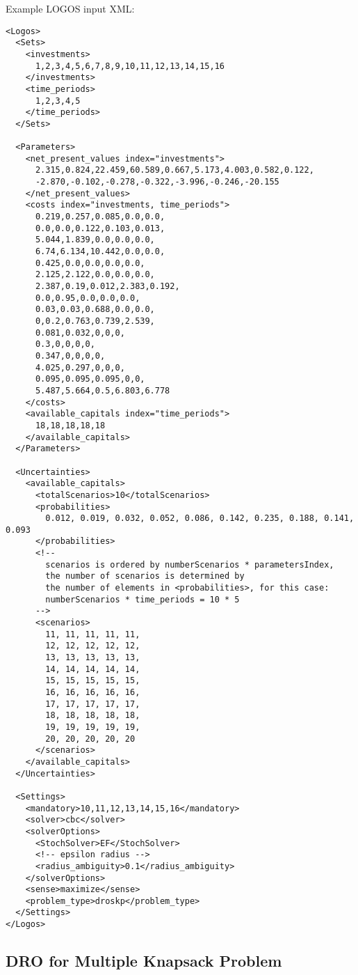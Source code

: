 Example LOGOS input XML:
\begin{lstlisting}[style=XML]
<Logos>
  <Sets>
    <investments>
      1,2,3,4,5,6,7,8,9,10,11,12,13,14,15,16
    </investments>
    <time_periods>
      1,2,3,4,5
    </time_periods>
  </Sets>

  <Parameters>
    <net_present_values index="investments">
      2.315,0.824,22.459,60.589,0.667,5.173,4.003,0.582,0.122,
      -2.870,-0.102,-0.278,-0.322,-3.996,-0.246,-20.155
    </net_present_values>
    <costs index="investments, time_periods">
      0.219,0.257,0.085,0.0,0.0,
      0.0,0.0,0.122,0.103,0.013,
      5.044,1.839,0.0,0.0,0.0,
      6.74,6.134,10.442,0.0,0.0,
      0.425,0.0,0.0,0.0,0.0,
      2.125,2.122,0.0,0.0,0.0,
      2.387,0.19,0.012,2.383,0.192,
      0.0,0.95,0.0,0.0,0.0,
      0.03,0.03,0.688,0.0,0.0,
      0,0.2,0.763,0.739,2.539,
      0.081,0.032,0,0,0,
      0.3,0,0,0,0,
      0.347,0,0,0,0,
      4.025,0.297,0,0,0,
      0.095,0.095,0.095,0,0,
      5.487,5.664,0.5,6.803,6.778
    </costs>
    <available_capitals index="time_periods">
      18,18,18,18,18
    </available_capitals>
  </Parameters>

  <Uncertainties>
    <available_capitals>
      <totalScenarios>10</totalScenarios>
      <probabilities>
        0.012, 0.019, 0.032, 0.052, 0.086, 0.142, 0.235, 0.188, 0.141, 0.093
      </probabilities>
      <!--
        scenarios is ordered by numberScenarios * parametersIndex,
        the number of scenarios is determined by
        the number of elements in <probabilities>, for this case:
        numberScenarios * time_periods = 10 * 5
      -->
      <scenarios>
        11, 11, 11, 11, 11,
        12, 12, 12, 12, 12,
        13, 13, 13, 13, 13,
        14, 14, 14, 14, 14,
        15, 15, 15, 15, 15,
        16, 16, 16, 16, 16,
        17, 17, 17, 17, 17,
        18, 18, 18, 18, 18,
        19, 19, 19, 19, 19,
        20, 20, 20, 20, 20
      </scenarios>
    </available_capitals>
  </Uncertainties>

  <Settings>
    <mandatory>10,11,12,13,14,15,16</mandatory>
    <solver>cbc</solver>
    <solverOptions>
      <StochSolver>EF</StochSolver>
      <!-- epsilon radius -->
      <radius_ambiguity>0.1</radius_ambiguity>
    </solverOptions>
    <sense>maximize</sense>
    <problem_type>droskp</problem_type>
  </Settings>
</Logos>
\end{lstlisting}


\subsection{DRO for Multiple Knapsack Problem}
\label{subsec:DRO_MKP}

